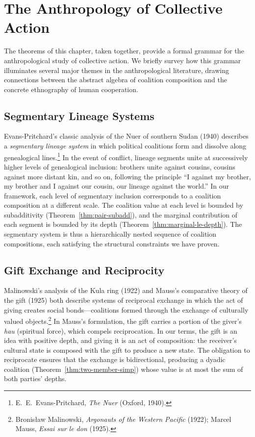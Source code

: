 \section{The Anthropology of Collective Action}
\label{sec:ch13-collective-action}

The theorems of this chapter, taken together, provide a formal grammar for
the anthropological study of collective action.  We briefly survey how
this grammar illuminates several major themes in the anthropological
literature, drawing connections between the abstract algebra of coalition
composition and the concrete ethnography of human cooperation.

\subsection{Segmentary Lineage Systems}

Evans-Pritchard's classic analysis of the Nuer of southern Sudan (1940)
describes a \emph{segmentary lineage system} in which political coalitions
form and dissolve along genealogical lines.\footnote{E.~E.~Evans-Pritchard,
\textit{The Nuer} (Oxford, 1940).}  In the event of conflict, lineage
segments unite at successively higher levels of genealogical inclusion:
brothers unite against cousins, cousins against more distant kin, and
so on, following the principle ``I against my brother, my brother and I
against our cousin, our lineage against the world.''  In our framework,
each level of segmentary inclusion corresponds to a coalition composition
at a different scale.  The coalition value at each level is bounded by
subadditivity (Theorem~\ref{thm:pair-subadd}), and the marginal
contribution of each segment is bounded by its depth
(Theorem~\ref{thm:marginal-le-depth}).  The segmentary system is thus
a hierarchically nested sequence of coalition compositions, each
satisfying the structural constraints we have proven.

\subsection{Gift Exchange and Reciprocity}

Malinowski's analysis of the Kula ring (1922) and Mauss's comparative
theory of the gift (1925) both describe systems of reciprocal exchange
in which the act of giving creates social bonds---coalitions formed
through the exchange of culturally valued objects.\footnote{Bronisław
Malinowski, \textit{Argonauts of the Western Pacific} (1922); Marcel
Mauss, \textit{Essai sur le don} (1925).}  In Mauss's formulation, the
gift carries a portion of the giver's \emph{hau} (spiritual force),
which compels reciprocation.  In our terms, the gift is an idea with
positive depth, and giving it is an act of composition: the receiver's
cultural state is composed with the gift to produce a new state.  The
obligation to reciprocate ensures that the exchange is bidirectional,
producing a dyadic coalition (Theorem~\ref{thm:two-member-simp}) whose
value is at most the sum of both parties' depths.

